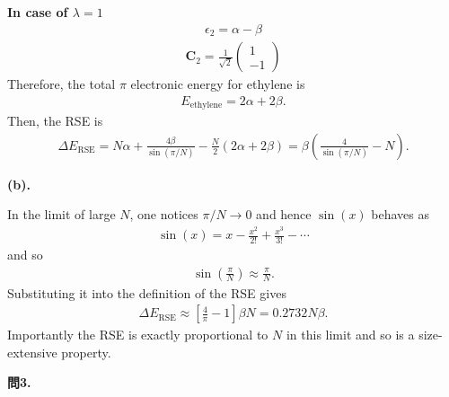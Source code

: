 \documentclass{jlreq}
\begin{document}
\noindent   
\textbf{In case of $\lambda=1$}\\ 
\begin{eqnarray}
    \epsilon_2=\alpha-\beta
\end{eqnarray}  
\begin{eqnarray}
    \mathbf{C}_2=\frac{1}{\sqrt{2}}
    \begin{pmatrix}
         1 \\
        -1
    \end{pmatrix}   
\end{eqnarray}
Therefore, the total $\pi$ electronic energy for ethylene is
\begin{eqnarray}
    E_\text{ethylene}=2\alpha+2\beta.
\end{eqnarray}  
Then, the RSE is
\begin{eqnarray}
    \Delta E_\text{RSE}=N\alpha+\frac{4\beta}{\sin(\pi/N)}-\frac{N}{2}\left(2\alpha+2\beta\right)=\beta\left(\frac{4}{\sin(\pi/N)}-N\right).
\end{eqnarray}

\noindent
\textbf{(b).}

In the limit of large $N$, one notices $\pi/N\rightarrow 0$ and hence $\sin(x)$ behaves as
\begin{eqnarray}
    \sin(x)=x-\frac{x^2}{2!}+\frac{x^3}{3!}-\cdots
\end{eqnarray}
and so
\begin{eqnarray}
    \sin\left(\frac{\pi}{N}\right)\approx\frac{\pi}{N}.
\end{eqnarray}
Substituting it into the definition of the RSE gives
\begin{eqnarray}
    \Delta E_\text{RSE}\approx\left[\frac{4}{\pi}-1\right]\beta N=0.2732N\beta.
\end{eqnarray}
Importantly the RSE is exactly proportional to $N$ in this limit and so is a size-extensive property.

\clearpage

\noindent
\textbf{問3.}\\
\end{document}
